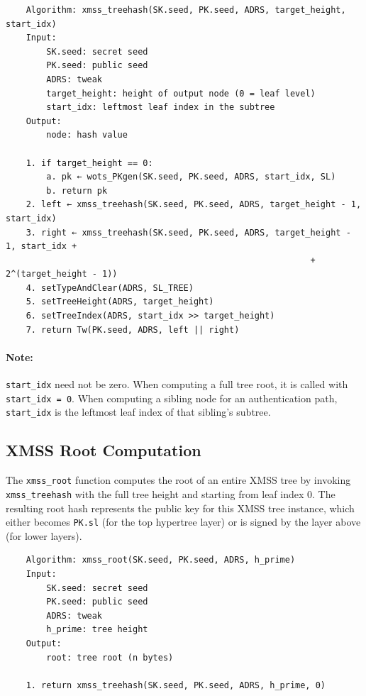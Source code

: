 
\begin{verbatim}
    Algorithm: xmss_treehash(SK.seed, PK.seed, ADRS, target_height, start_idx)
    Input:
        SK.seed: secret seed
        PK.seed: public seed
        ADRS: tweak
        target_height: height of output node (0 = leaf level)
        start_idx: leftmost leaf index in the subtree
    Output:
        node: hash value

    1. if target_height == 0:
        a. pk ← wots_PKgen(SK.seed, PK.seed, ADRS, start_idx, SL)
        b. return pk
    2. left ← xmss_treehash(SK.seed, PK.seed, ADRS, target_height - 1, start_idx)
    3. right ← xmss_treehash(SK.seed, PK.seed, ADRS, target_height - 1, start_idx + 
                                                            + 2^(target_height - 1))
    4. setTypeAndClear(ADRS, SL_TREE)
    5. setTreeHeight(ADRS, target_height)
    6. setTreeIndex(ADRS, start_idx >> target_height)
    7. return Tw(PK.seed, ADRS, left || right)
\end{verbatim}

\paragraph{Note:} \texttt{start\_idx} need not be zero. When computing a full tree root, it is called with \texttt{start\_idx = 0}. When computing a sibling node for an authentication path, \texttt{start\_idx} is the leftmost leaf index of that sibling's subtree.

\subsection{XMSS Root Computation}
The \texttt{xmss\_root} function computes the root of an entire XMSS tree by invoking \texttt{xmss\_treehash} with the full tree height and starting from leaf index 0. The resulting root hash represents the public key for this XMSS tree instance, which either becomes \texttt{PK.sl} (for the top hypertree layer) or is signed by the layer above (for lower layers).
\begin{verbatim}
    Algorithm: xmss_root(SK.seed, PK.seed, ADRS, h_prime)
    Input:
        SK.seed: secret seed
        PK.seed: public seed
        ADRS: tweak
        h_prime: tree height
    Output:
        root: tree root (n bytes)

    1. return xmss_treehash(SK.seed, PK.seed, ADRS, h_prime, 0)
\end{verbatim}

